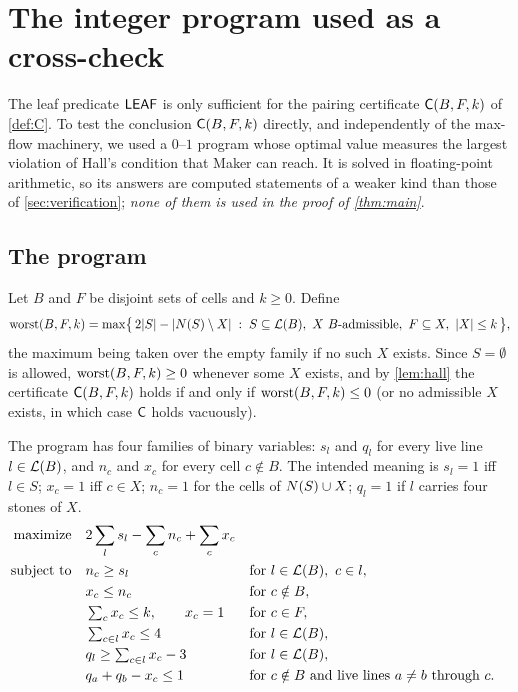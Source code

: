 \section{The integer program used as a cross-check}\label{sec:ip}


The leaf predicate $\mathsf{LEAF}$ is only sufficient for the pairing certificate $\mathsf{C}(B,F,k)$ of \cref{def:C}.
To test the conclusion $\mathsf{C}(B,F,k)$ directly, and independently of the max-flow machinery, we used a
$0$--$1$ program whose optimal value measures the largest violation of Hall's condition that Maker can
reach. It is solved in floating-point arithmetic, so its answers are computed statements of a weaker kind
than those of \cref{sec:verification}; \emph{none of them is used in the proof of \cref{thm:main}}.

\subsection{The program}\label{ssec:ip-model}

Let $B$ and $F$ be disjoint sets of cells and $k\ge 0$. Define
\[
\operatorname{worst}(B,F,k)=\max\bigl\{\,2|S|-|N(S)\setminus X|\;:\; S\subseteq\mathcal{L}(B),\ X \text{ $B$-admissible},\
F\subseteq X,\ |X|\le k\,\bigr\},
\]
the maximum being taken over the empty family if no such $X$ exists. Since $S=\emptyset$ is allowed,
$\operatorname{worst}(B,F,k)\ge0$ whenever some $X$ exists, and by \cref{lem:hall} the certificate $\mathsf{C}(B,F,k)$ holds
if and only if $\operatorname{worst}(B,F,k)\le 0$ (or no admissible $X$ exists, in which case $\mathsf{C}$ holds vacuously).

The program has four families of binary variables: $s_l$ and $q_l$ for every live line $l\in\mathcal{L}(B)$, and
$n_c$ and $x_c$ for every cell $c\notin B$. The intended meaning is $s_l=1$ iff $l\in S$; $x_c=1$ iff
$c\in X$; $n_c=1$ for the cells of $N(S)\cup X$; $q_l=1$ if $l$ carries four stones of $X$.
\begin{align}
\text{maximize}\quad & 2\sum_{l}s_l-\sum_{c}n_c+\sum_{c}x_c \label{eq:ip-obj}\\
\text{subject to}\quad
 & n_c\ge s_l && \text{for } l\in\mathcal{L}(B),\ c\in l, \label{eq:ip-n}\\
 & x_c\le n_c && \text{for } c\notin B, \label{eq:ip-xn}\\
 & \textstyle\sum_{c}x_c\le k,\qquad x_c=1 && \text{for } c\in F, \label{eq:ip-k}\\
 & \textstyle\sum_{c\in l}x_c\le 4 && \text{for } l\in\mathcal{L}(B), \label{eq:ip-cap}\\
 & \textstyle q_l\ge\sum_{c\in l}x_c-3 && \text{for } l\in\mathcal{L}(B), \label{eq:ip-q}\\
 & q_a+q_b-x_c\le 1 && \text{for } c\notin B \text{ and live lines } a\neq b \text{ through } c. \label{eq:ip-danger}
\end{align}

